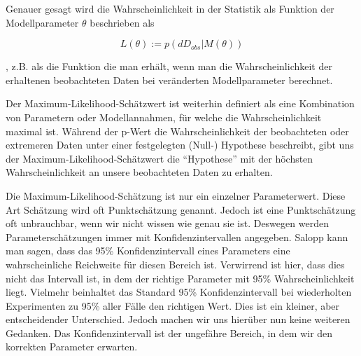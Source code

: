 \documentclass[a4paper,twoside]{tufte-book}\usepackage[]{graphicx}\usepackage[]{color}
\begin{document}
Genauer gesagt wird die Wahrscheinlichkeit in der Statistik als Funktion der Modellparameter $\theta$ beschrieben als

\begin{equation}
L(\theta) := p(dD_{obs} | M(\theta))
\end{equation}

, z.B. als die Funktion die man erhält, wenn man die Wahrscheinlichkeit der erhaltenen beobachteten Daten bei veränderten Modellparameter berechnet.

Der Maximum-Likelihood-Schätzwert ist weiterhin definiert als eine Kombination von Parametern oder Modellannahmen, für welche die Wahrscheinlichkeit maximal ist. Während der p-Wert die Wahrscheinlichkeit der beobachteten 
oder extremeren Daten unter einer festgelegten (Null-) Hypothese beschreibt, gibt uns der Maximum-Likelihood-Schätzwert die "`Hypothese"' mit der höchsten Wahrscheinlichkeit an unsere beobachteten Daten zu erhalten.

Die Maximum-Likelihood-Schätzung ist nur ein einzelner Parameterwert. Diese Art Schätzung wird oft Punktschätzung genannt. Jedoch ist eine Punktschätzung oft unbrauchbar, wenn wir nicht wissen wie genau sie ist. Deswegen werden Parameterschätzungen immer mit Konfidenzintervallen angegeben. Salopp kann man sagen, dass das 95\% Konfidenzintervall eines Parameters eine wahrscheinliche Reichweite für diesen Bereich ist. Verwirrend ist hier, dass dies nicht das Intervall ist, in dem der richtige Parameter mit 95\% Wahrscheinlichkeit liegt. Vielmehr beinhaltet das Standard 95\% Konfidenzintervall bei wiederholten Experimenten zu 95\% aller Fälle den richtigen Wert. Dies ist ein kleiner, aber entscheidender Unterschied. Jedoch machen wir uns hierüber nun keine weiteren Gedanken. Das Konfidenzintervall ist der ungefähre Bereich, in dem wir den korrekten Parameter erwarten. 
\end{document}
